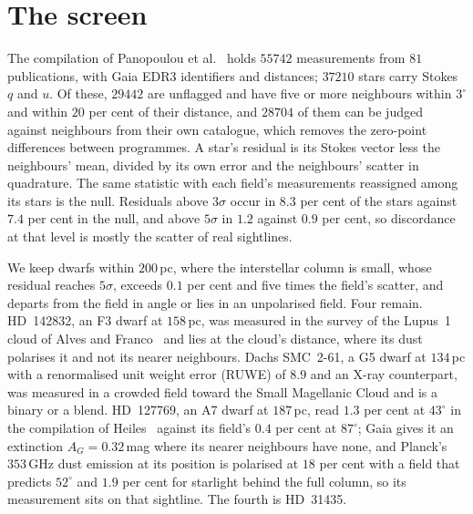\documentclass[3p,11pt]{elsarticle}
\begin{document}
\section{The screen}\label{sec:screen}

The compilation of Panopoulou et al.~\cite{Panopoulou2025} holds $55742$ measurements
from $81$ publications, with Gaia EDR3 identifiers and distances; $37210$ stars carry
Stokes $q$ and $u$. Of these, $29442$ are unflagged and have five or more neighbours
within $3^\circ$ and within $20$ per cent of their distance, and $28704$ of them can be
judged against neighbours from their own catalogue, which removes the zero-point
differences between programmes. A star's residual is its Stokes vector less the
neighbours' mean, divided by its own error and the neighbours' scatter in quadrature.
The same statistic with each field's measurements reassigned among its stars is the
null. Residuals above $3\sigma$ occur in $8.3$ per cent of the stars against $7.4$ per
cent in the null, and above $5\sigma$ in $1.2$ against $0.9$ per cent, so discordance
at that level is mostly the scatter of real sightlines.

We keep dwarfs within $200$\,pc, where the interstellar column is small, whose residual
reaches $5\sigma$, exceeds $0.1$ per cent and five times the field's scatter, and
departs from the field in angle or lies in an unpolarised field. Four remain. HD~142832,
an F3 dwarf at $158$\,pc, was measured in the survey of the Lupus~1 cloud of Alves and
Franco~\cite{AlvesFranco2006} and lies at the cloud's distance, where its dust
polarises it and not its nearer neighbours. Dachs SMC~2-61, a G5 dwarf at $134$\,pc
with a renormalised unit weight error (RUWE) of $8.9$ and an X-ray counterpart, was
measured in a crowded field toward the Small Magellanic Cloud and is a binary or a
blend. HD~127769, an A7 dwarf at $187$\,pc, read $1.3$ per cent at $43^\circ$ in the
compilation of Heiles~\cite{Heiles2000} against its field's $0.4$ per cent at $87^\circ$;
Gaia gives it an extinction $A_G=0.32$\,mag where its nearer neighbours have none, and
Planck's $353$\,GHz dust emission at its position is polarised at $18$ per cent with a
field that predicts $52^\circ$ and $1.9$ per cent for starlight behind the full column,
so its measurement sits on that sightline. The fourth is HD~31435.

\end{document}
